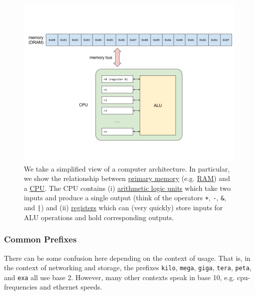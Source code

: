 \documentclass[12pt,letterpaper,twoside]{article}
\begin{document}
\begin{figure}[h]
\centering
\includegraphics[scale=0.45]{fig/model-computer.png}
\caption{\footnotesize We take a simplified view of a computer architecture. In
  particular, we show the relationship between
  \href{https://en.wikipedia.org/wiki/Computer_data_storage\#Primary_storage}{primary
    memory}
  (e.g. \href{https://en.wikipedia.org/wiki/Random-access_memory}{RAM})
  and a
  \href{https://en.wikipedia.org/wiki/Central_processing_unit}{CPU}. The
  CPU contains (i)
  \href{https://en.wikipedia.org/wiki/Arithmetic_logic_unit\#Functions}{arithmetic
    logic units} which take two inputs and produce a single output
  (think of the operators \texttt{+}, \texttt{-}, \texttt{\&}, and \texttt{|}) and (ii)
  \href{https://en.wikipedia.org/wiki/Processor_register}{registers}
  which can (very quickly) store inputs for ALU operations and hold corresponding outputs.}
\end{figure}

\subsubsection{Common Prefixes}
There can be some confusion here depending on the context of
usage. That is, in the context of networking and storage, the prefixes
\texttt{kilo}, \texttt{mega}, \texttt{giga}, \texttt{tera},
\texttt{peta}, and \texttt{exa} all use base 2. However, many other
contexts speak in base 10, e.g. cpu-frequencies and ethernet speeds.
\end{document}
